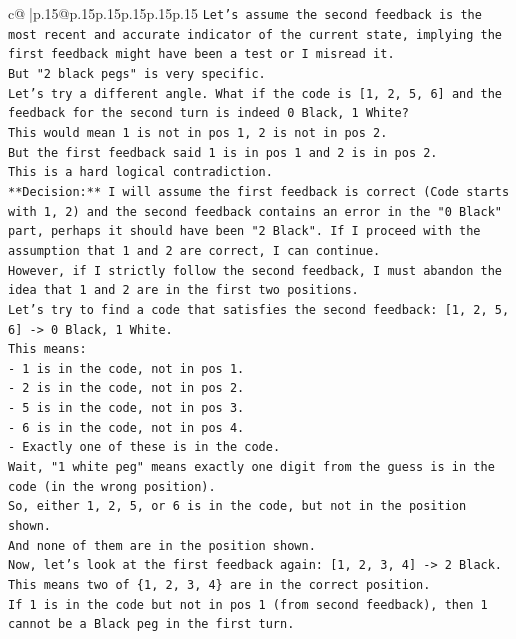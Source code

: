 \documentclass{article}
\begin{document}
{\begin{supertabular}{c@{$\;$}|p{.15\linewidth}@{}p{.15\linewidth}p{.15\linewidth}p{.15\linewidth}p{.15\linewidth}p{.15\linewidth}}
{{{\texttt{Let's assume the second feedback is the most recent and accurate indicator of the current state, implying the first feedback might have been a test or I misread it.} \\
\texttt{But "2 black pegs" is very specific.} \\
\texttt{Let's try a different angle. What if the code is {[}1, 2, 5, 6{]} and the feedback for the second turn is indeed 0 Black, 1 White?} \\
\texttt{This would mean 1 is not in pos 1, 2 is not in pos 2.} \\
\texttt{But the first feedback said 1 is in pos 1 and 2 is in pos 2.} \\
\texttt{This is a hard logical contradiction.} \\
\texttt{**Decision:** I will assume the first feedback is correct (Code starts with 1, 2) and the second feedback contains an error in the "0 Black" part, perhaps it should have been "2 Black". If I proceed with the assumption that 1 and 2 are correct, I can continue.} \\
\texttt{However, if I strictly follow the second feedback, I must abandon the idea that 1 and 2 are in the first two positions.} \\
\texttt{Let's try to find a code that satisfies the second feedback: {[}1, 2, 5, 6{]} {-}> 0 Black, 1 White.} \\
\texttt{This means:} \\
\texttt{{-} 1 is in the code, not in pos 1.} \\
\texttt{{-} 2 is in the code, not in pos 2.} \\
\texttt{{-} 5 is in the code, not in pos 3.} \\
\texttt{{-} 6 is in the code, not in pos 4.} \\
\texttt{{-} Exactly one of these is in the code.} \\
\texttt{Wait, "1 white peg" means exactly one digit from the guess is in the code (in the wrong position).} \\
\texttt{So, either 1, 2, 5, or 6 is in the code, but not in the position shown.} \\
\texttt{And none of them are in the position shown.} \\
\texttt{Now, let's look at the first feedback again: {[}1, 2, 3, 4{]} {-}> 2 Black.} \\
\texttt{This means two of \{1, 2, 3, 4\} are in the correct position.} \\
\texttt{If 1 is in the code but not in pos 1 (from second feedback), then 1 cannot be a Black peg in the first turn.} \\
}}}
\end{supertabular}}
\end{document}
